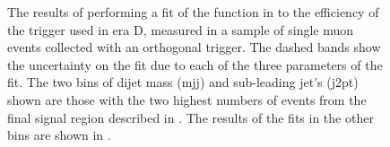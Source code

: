 \begin{figure}
  \caption{The results of performing a fit of the function in  to the efficiency of the trigger used in era D, measured in a sample of single muon events collected with an orthogonal trigger. The dashed bands show the uncertainty on the fit due to each of the three parameters of the fit. The two bins of dijet mass (mjj) and sub-leading jet's \pt (j2pt) shown are those with the two highest numbers of events from the final signal region described in . The results of the fits in the other bins are shown in .}
  \label{fig:parkedtrigeff}
\end{figure}

